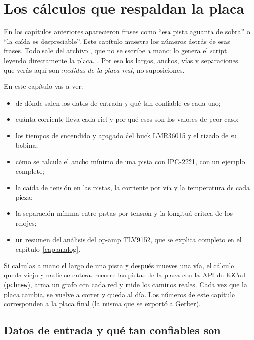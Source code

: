 \chapter{Los cálculos que respaldan la placa}\label{cap:calculos}
\DeclareSIUnit{}

En los capítulos anteriores aparecieron frases como ``esa pista aguanta de sobra'' o ``la caída es despreciable''.
Este capítulo muestra los números detrás de esas frases. Todo sale del archivo , que no se
escribe a mano: lo genera el script  leyendo directamente la placa, . Por eso
los largos, anchos, vías y separaciones que verás aquí son \emph{medidas de la placa real}, no suposiciones.

En este capítulo vas a ver:
\begin{itemize}
  \item de dónde salen los datos de entrada y qué tan confiable es cada uno;
  \item cuánta corriente lleva cada riel y por qué esos son los valores de peor caso;
  \item los tiempos de encendido y apagado del buck LMR36015 y el rizado de su bobina;
  \item cómo se calcula el ancho mínimo de una pista con IPC-2221, con un ejemplo completo;
  \item la caída de tensión en las pistas, la corriente por vía y la temperatura de cada pieza;
  \item la separación mínima entre pistas por tensión y la longitud crítica de los relojes;
  \item un resumen del análisis del op-amp TLV9152, que se explica completo en el capítulo~\ref{cap:analog}.
\end{itemize}

\begin{idea}
Si calculas a mano el largo de una pista y después mueves una vía, el cálculo queda viejo y nadie se entera.
 recorre las pistas de la placa con la API de KiCad (\texttt{pcbnew}), arma un grafo con cada red
y mide los caminos reales. Cada vez que la placa cambia, se vuelve a correr y  queda al día. Los
números de este capítulo corresponden a la placa final (la misma que se exportó a Gerber).
\end{idea}

\section{Datos de entrada y qué tan confiables son}\label{sec:c10-datos}

